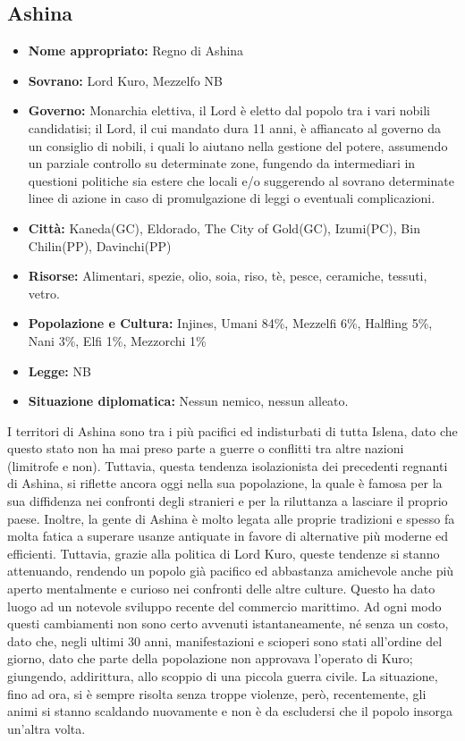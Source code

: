 \documentclass[a4paper]{report}
\begin{document}
\begin{multicols}{2}
\subsection*{Ashina}
\begin{itemize}
	\item \textbf{Nome appropriato:} Regno di Ashina
	\item \textbf{Sovrano:} Lord Kuro, Mezzelfo NB
	\item \textbf{Governo:} Monarchia elettiva, il Lord è eletto dal popolo tra i vari nobili candidatisi; il Lord, il cui mandato dura 11 anni, è affiancato al governo da un consiglio di nobili, i quali lo aiutano nella gestione del potere, assumendo un parziale controllo su determinate zone, fungendo da intermediari in questioni politiche sia estere che locali e/o suggerendo al sovrano determinate linee di azione in caso di promulgazione di leggi o eventuali complicazioni.
	\item \textbf{Città:} Kaneda(GC), Eldorado, The City of Gold(GC), Izumi(PC), Bin Chilin(PP), Davinchi(PP)
	\item \textbf{Risorse:} Alimentari, spezie, olio, soia, riso, tè, pesce, ceramiche, tessuti, vetro. 
	\item \textbf{Popolazione e Cultura:} Injines, Umani 84\%, Mezzelfi 6\%, Halfling 5\%, Nani 3\%, Elfi 1\%, Mezzorchi 1\%
	\item \textbf{Legge:} NB
	\item \textbf{Situazione diplomatica:} Nessun nemico, nessun alleato.
\end{itemize}
I territori di Ashina sono tra i più pacifici ed indisturbati di tutta Islena, dato che questo stato non ha mai preso parte a guerre o conflitti tra altre nazioni (limitrofe e non). Tuttavia, questa tendenza isolazionista dei precedenti regnanti di Ashina, si riflette ancora oggi nella sua popolazione, la quale è famosa per la sua diffidenza nei confronti degli stranieri e per la riluttanza a lasciare il proprio paese. Inoltre, la gente di Ashina è molto legata alle proprie tradizioni e spesso fa molta fatica a superare usanze antiquate in favore di alternative più moderne ed efficienti. Tuttavia, grazie alla politica di Lord Kuro, queste tendenze si stanno attenuando, rendendo un popolo già pacifico ed abbastanza amichevole anche più aperto mentalmente e curioso nei confronti delle altre culture. Questo ha dato luogo ad un notevole sviluppo recente del commercio marittimo. Ad ogni modo questi cambiamenti non sono certo avvenuti istantaneamente, né senza un costo, dato che, negli ultimi 30 anni, manifestazioni e scioperi sono stati all’ordine del giorno, dato che parte della popolazione non approvava l’operato di Kuro; giungendo, addirittura, allo scoppio di una piccola guerra civile. La situazione, fino ad ora, si è sempre risolta senza troppe violenze, però, recentemente, gli animi si stanno scaldando nuovamente e non è da escludersi che il popolo insorga un’altra volta.


\end{multicols}
\end{document}
